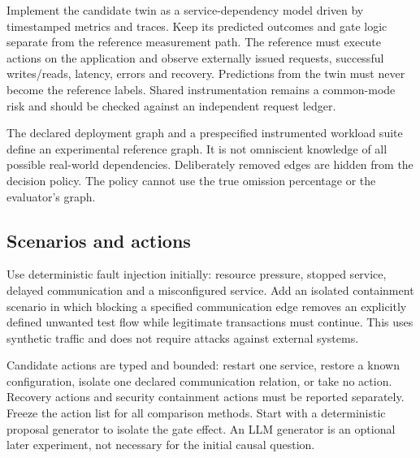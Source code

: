 ﻿\documentclass[sigconf,nonacm]{acmart}
\begin{document}
\begin{figure}[t]
\label{fig:system}
\end{figure}


Implement the candidate twin as a service-dependency model driven by timestamped metrics and traces. Keep its predicted outcomes and gate logic separate from the reference measurement path. The reference must execute actions on the application and observe externally issued requests, successful writes/reads, latency, errors and recovery. Predictions from the twin must never become the reference labels. Shared instrumentation remains a common-mode risk and should be checked against an independent request ledger.

The declared deployment graph and a prespecified instrumented workload suite define an experimental reference graph. It is not omniscient knowledge of all possible real-world dependencies. Deliberately removed edges are hidden from the decision policy. The policy cannot use the true omission percentage or the evaluator's graph.

\subsection{Scenarios and actions}
Use deterministic fault injection initially: resource pressure, stopped service, delayed communication and a misconfigured service. Add an isolated containment scenario in which blocking a specified communication edge removes an explicitly defined unwanted test flow while legitimate transactions must continue. This uses synthetic traffic and does not require attacks against external systems.

Candidate actions are typed and bounded: restart one service, restore a known configuration, isolate one declared communication relation, or take no action. Recovery actions and security containment actions must be reported separately. Freeze the action list for all comparison methods. Start with a deterministic proposal generator to isolate the gate effect. An LLM generator is an optional later experiment, not necessary for the initial causal question.
\end{document}
